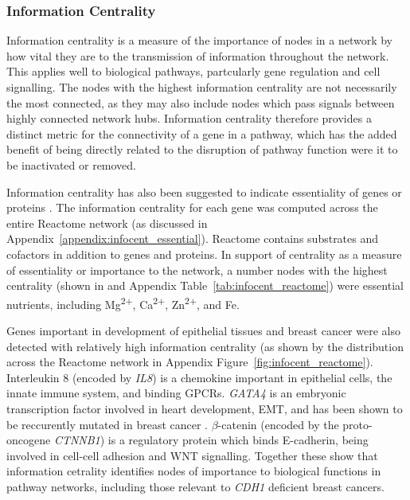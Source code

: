 \subsubsection{Information Centrality}  \label{chapt4:Network_InfoCent}

Information centrality is a measure of the importance of nodes in a network by how vital they are to the transmission of information throughout the network. This applies well to biological pathways, partcularly gene regulation and cell signalling. The nodes with the highest information centrality are not necessarily the most connected, as they may also include nodes which pass signals between highly connected network hubs. Information centrality therefore provides a distinct metric for the connectivity of a gene in a pathway, which has the added benefit of being directly related to the disruption of pathway function were it to be inactivated or removed.

Information centrality has also been suggested to indicate essentiality of genes or proteins \citep{Kranthi2013}. The information centrality for each gene was computed across the entire Reactome network (as discussed in Appendix~\ref{appendix:infocent_essential}). Reactome contains substrates and cofactors in addition to genes and proteins. In support of centrality as a measure of essentiality or importance to the network, a number nodes with the highest centrality (shown in and Appendix Table~\ref{tab:infocent_reactome}) were essential nutrients, including Mg\textsuperscript{2$+$}, Ca\textsuperscript{2$+$}, Zn\textsuperscript{2$+$}, and Fe.%

Genes important in development of epithelial tissues and breast cancer were also detected with relatively high information centrality (as shown by the distribution across the Reactome network in Appendix Figure~\ref{fig:infocent_reactome}). Interleukin 8 (encoded by \textit{IL8}) is a chemokine important in epithelial cells, the innate immune system, and binding GPCRs. \textit{GATA4} is an embryonic transcription factor involved in heart development, \gls{EMT}, and has been shown to be reccurently mutated in breast cancer \citep{TCGA2012}. $\beta$-catenin (encoded by the proto-oncogene \textit{CTNNB1}) is a regulatory protein which binds E-cadherin, being involved in cell-cell adhesion and \gls{WNT} signalling. Together these show that information cetrality identifies nodes of importance to biological functions in pathway networks, including those relevant to \textit{CDH1} deficient breast cancers. 

